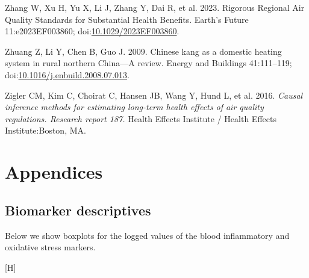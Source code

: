 \documentclass[
  letterpaper,
  DIV=11,
  numbers=noendperiod]{scrartcl}
\makeatletter
\newlength{\cslhangindent}
\newenvironment{CSLReferences}[2] %
 {\begin{list}{}{%
  \setlength{\itemindent}{0pt}
  \setlength{\leftmargin}{0pt}
  \setlength{\parsep}{0pt}
  \ifodd #1
   \setlength{\leftmargin}{\cslhangindent}
   \setlength{\itemindent}{-1\cslhangindent}
  \fi
  \setlength{\itemsep}{#2\baselineskip}}}
 {\end{list}}
\renewenvironment{figure}%
   {\renewcommand\familydefault\sfdefault
    \@float{figure}}
   {\end@float}
\makeatother
\begin{document}
\begin{CSLReferences}{1}{1}
Zhang W, Xu H, Yu X, Li J, Zhang Y, Dai R, et al. 2023. Rigorous
{Regional Air Quality Standards} for {Substantial Health Benefits}.
Earth's Future 11:e2023EF003860;
doi:\href{https://doi.org/10.1029/2023EF003860}{10.1029/2023EF003860}.

Zhuang Z, Li Y, Chen B, Guo J. 2009. Chinese kang as a domestic heating
system in rural northern {China}---{A} review. Energy and Buildings
41:111--119;
doi:\href{https://doi.org/10.1016/j.enbuild.2008.07.013}{10.1016/j.enbuild.2008.07.013}.

Zigler CM, Kim C, Choirat C, Hansen JB, Wang Y, Hund L, et al. 2016.
\emph{Causal inference methods for estimating long-term health effects
of air quality regulations. {Research} report 187.} Health Effects
Institute / Health Effects Institute:Boston, MA.

\end{CSLReferences}

\newpage
\appendix
\renewcommand{\thefigure}{A\arabic{figure}}
\renewcommand{\thetable}{A\arabic{table}}
\setcounter{figure}{0}
\setcounter{table}{0}

\section{Appendices}\label{appendices}

\subsection{Biomarker descriptives}\label{biomarker-descriptives}

Below we show boxplots for the logged values of the blood inflammatory
and oxidative stress markers.

\begin{figure}[H]

\caption{\label{fig-afig-biomarkers}Boxplots for markers of systemic
inflammation including C-reactive protein (CRP), interleukin-6 (IL-6),
tumour necrosis factor alpha (TNF-\(\alpha\)) and malondialdehyde (MDA)}


\end{figure}%
\end{document}
